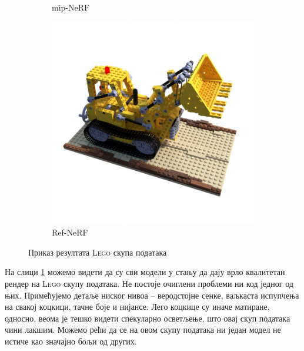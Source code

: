 \documentclass[12pt, a4paper, twoside]{book}
\numberwithin{equation}{chapter}
\numberwithin{theorem}{section}
\numberwithin{definition}{section}
\numberwithin{definitionChapter}{chapter}
\begin{document}
\begin{figure}[H]
\begin{subfigure}{0.475\textwidth}
			\caption{mip-NeRF}
		\end{subfigure}
		\begin{subfigure}{0.475\textwidth}
			\centering
			\includegraphics[scale=0.25]{img/refnerf/refnerf_lego_31.jpg}
			\caption{Ref-NeRF}
		\end{subfigure}
		\caption{Приказ резултата \textsc{Lego} скупа података}
		\label{fig-lego-results}
	\end{figure}

На слици \ref{fig-lego-results} можемо видети да су сви модели у стању да дају врло квалитетан рендер
на \textsc{Lego} скупу података.
Не постоје очиглени проблеми ни код једног од њих. Примећујемо детаље ниског нивоа -- веродстојне сенке,
ваљкаста испупчења на свакој коцкици, тачне боје и нијансе. Лего коцкице су иначе матиране, односно, веома је тешко
видети спекуларно осветљење, што овај скуп података чини лакшим. Можемо рећи да се на овом скупу података ни један
модел не истиче као значајно бољи од других.
\end{document}
